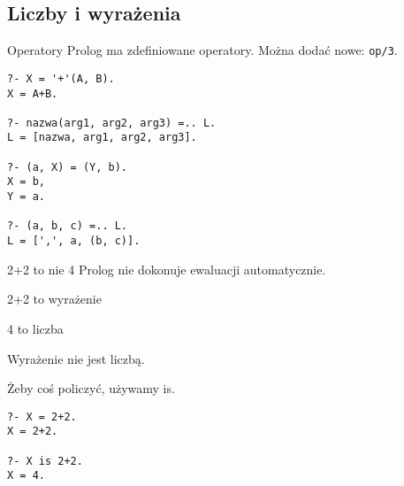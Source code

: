 \documentclass[blue]{beamer}
\begin{document}
\subsection{Liczby i wyrażenia}
\begin{frame}[fragile]{Operatory}
Prolog ma zdefiniowane operatory. Można dodać nowe: \verb+op/3+.
\begin{lstlisting}
?- X = '+'(A, B).
X = A+B.

?- nazwa(arg1, arg2, arg3) =.. L.
L = [nazwa, arg1, arg2, arg3].

?- (a, X) = (Y, b).
X = b,
Y = a.

?- (a, b, c) =.. L.
L = [',', a, (b, c)].
\end{lstlisting}
\end{frame}
\begin{frame}[fragile]{2+2 to nie 4}
Prolog nie dokonuje ewaluacji automatycznie.

2+2 to wyrażenie

4 to liczba

Wyrażenie nie jest liczbą.

Żeby coś policzyć, używamy is.

\begin{lstlisting}
?- X = 2+2.
X = 2+2.

?- X is 2+2.
X = 4.
\end{lstlisting}
\end{frame}
\end{document}
